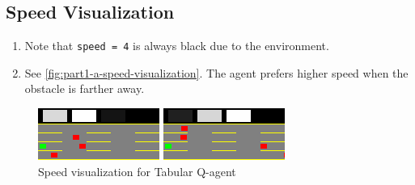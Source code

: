 \subsection{Speed Visualization}
\begin{enumerate}
\item Note that \texttt{speed = 4} is always black due to the environment.
\item See \autoref{fig:part1-a-speed-visualization}. The agent prefers higher speed when the obstacle is farther away.
\end{enumerate}

\begin{figure}[H]
    \centering
    \begin{minipage}{0.48\textwidth}
        \centering
        \includegraphics[width=\linewidth]{plots/part1-a-speed_visualization_00_step_0120.png}
    \end{minipage}
    \hfill
    \begin{minipage}{0.48\textwidth}
        \centering
        \includegraphics[width=\linewidth]{plots/part1-a-speed_visualization_00_step_0260.png}
    \end{minipage}
    \caption{Speed visualization for Tabular Q-agent}
    \label{fig:part1-a-speed-visualization}
\end{figure}





